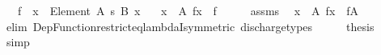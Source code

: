 \begin{isabellebody}
\ \ \ {\isachardoublequoteopen}f\ {\isacharcolon}{\kern0pt}\ {\isacharparenleft}{\kern0pt}x\ {\isacharcolon}{\kern0pt}\ Element\ A{\isacharparenright}{\kern0pt}\ {\isasymrightarrow}s\ B\ x{\isachardoublequoteclose}\isanewline
\ \ \ {\isachardoublequoteopen}{\isacharparenleft}{\kern0pt}{\isasymlambda}x\ {\isasymin}\ A{\isachardot}{\kern0pt}\ f{\isacharbackquote}{\kern0pt}x{\isacharparenright}{\kern0pt}\ {\isasymsubseteq}\ f{\isachardoublequoteclose}\isanewline
%
\isadelimproof
%
\endisadelimproof
%
\isatagproof
{}\isamarkupfalse%
\ {\isacharminus}{\kern0pt}\isanewline
\ \ \isamarkupfalse%
\ assms\ \isamarkupfalse%
\ {\isachardoublequoteopen}{\isacharparenleft}{\kern0pt}{\isasymlambda}x\ {\isasymin}\ A{\isachardot}{\kern0pt}\ f{\isacharbackquote}{\kern0pt}x{\isacharparenright}{\kern0pt}\ {\isacharequal}{\kern0pt}\ f{\isasymrestriction}\isactrlbsub A\isactrlesub {\isachardoublequoteclose}\isanewline
\ \ \ \ \isamarkupfalse%
\ {\isacharparenleft}{\kern0pt}elim\ Dep{\isacharunderscore}{\kern0pt}Function{\isacharunderscore}{\kern0pt}restrict{\isacharunderscore}{\kern0pt}eq{\isacharunderscore}{\kern0pt}lambdaI{\isacharbrackleft}{\kern0pt}symmetric{\isacharbrackright}{\kern0pt}{\isacharparenright}{\kern0pt}\ discharge{\isacharunderscore}{\kern0pt}types\isanewline
\ \ \isamarkupfalse%
\ \isamarkupfalse%
\ {\isacharquery}{\kern0pt}thesis\ \isamarkupfalse%
\ simp\isanewline
{}\isamarkupfalse%
%
\endisatagproof
{\isafoldproof}%
%
\isadelimproof
\isanewline
%
\endisadelimproof
\isanewline
%
\isadelimtheory
\isanewline
%
\endisadelimtheory
%
\isatagtheory
{}\isamarkupfalse%
%
\endisatagtheory
{\isafoldtheory}%
%
\isadelimtheory
%
\endisadelimtheory
%
\end{isabellebody}%
\endinput
